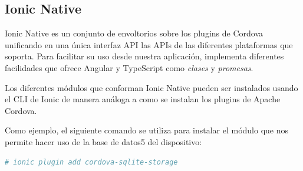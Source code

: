 \subsection{Ionic Native}
\label{subsec:IonicNative}

Ionic Native es un conjunto de envoltorios sobre los plugins de Cordova unificando en una única interfaz \gls{API} las \glspl{API} de las diferentes plataformas que soporta. Para facilitar su uso desde nuestra aplicación, implementa diferentes facilidades que ofrece Angular y TypeScript como \emph{clases} y \emph{promesas}.

Los diferentes módulos que conforman Ionic Native pueden ser instalados usando el \gls{CLI} de Ionic de manera análoga a como se instalan los plugins de Apache Cordova.

Como ejemplo, el siguiente comando se utiliza para instalar el módulo que nos permite hacer uso de la base de datos5 del dispositivo:

\begin{lstlisting}[language=bash]
  # ionic plugin add cordova-sqlite-storage
\end{lstlisting}
